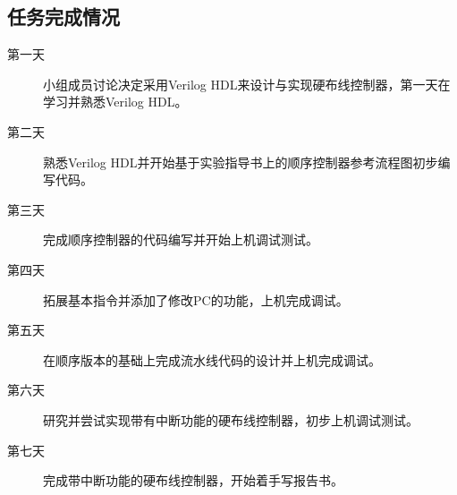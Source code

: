 \subsection{任务完成情况}

\begin{description}
    \item[第一天] 小组成员讨论决定采用Verilog HDL来设计与实现硬布线控制器，第一天在学习并熟悉Verilog HDL。
    \item[第二天] 熟悉Verilog HDL并开始基于实验指导书上的顺序控制器参考流程图初步编写代码。
    \item[第三天] 完成顺序控制器的代码编写并开始上机调试测试。
    \item[第四天] 拓展基本指令并添加了修改PC的功能，上机完成调试。
    \item[第五天] 在顺序版本的基础上完成流水线代码的设计并上机完成调试。
    \item[第六天] 研究并尝试实现带有中断功能的硬布线控制器，初步上机调试测试。
    \item[第七天] 完成带中断功能的硬布线控制器，开始着手写报告书。      
\end{description}

